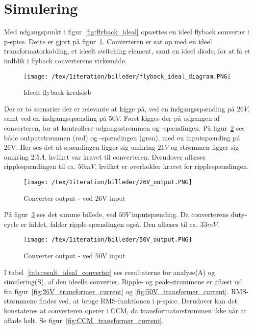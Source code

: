 \section{Simulering}
Med udgangspunkt i figur~\ref{fig:flyback_ideal} opsættes en ideel flyback converter i p-spice. Dette er gjort på figur~\ref{fig:ideal_flyback_diagram}. Converteren er sat op med en ideel transformatorkobling, et ideelt switching element, samt en ideel diode, for at få et indblik i flyback converterens virkemåde. 


\begin{figure}[H]
	\center
	\texttt{[image: /tex/1iteration/billeder/flyback\_ideal\_diagram.PNG]}
	\caption{Ideelt flyback kredsløb}
	\label{fig:ideal_flyback_diagram}
\end{figure}

Der er to scenarier der er relevante at kigge på, ved en indgangsspænding på $26V$, samt ved en indgangsspænding på $50V$. Først kigges der på udgangen af converteren, for at kontrollere udgangsstrømmen og -spændingen. På figur~\ref{fig:26V_ideal_output} ses både outputstrømmen (rød) og -spændingen (grøn), med en inputspænding på 26V. Her ses det at spændingen ligger sig omkring $21V$ og strømmen ligger sig omkring $2.5A$, hvilket var kravet til converteren. Derudover aflæses ripplespændingen til ca. $50mV$, hvilket er overholder kravet for ripplespændingen. 

\begin{figure}[H]
	\center
	\texttt{[image: /tex/1iteration/billeder/26V\_output.PNG]}
	\caption{Converter output - ved 26V input}
	\label{fig:26V_ideal_output}
\end{figure}

\noindent På figur~\ref{fig:50V_ideal_output} ses det samme billede, ved $50V$ inputspænding. Da converterens duty-cycle er faldet, falder ripple-spændingen også. Den aflæses til ca. $33mV$. 


\begin{figure}[H]
	\center
	\texttt{[image: /tex/1iteration/billeder/50V\_output.PNG]}
	\caption{Converter output - ved 50V input}
	\label{fig:50V_ideal_output}
\end{figure}

\noindent I tabel~\ref{tab:result_ideal_converter} ses resultaterne for analyse(A) og simulering(S), af den ideelle converter. Ripple- og peak-strømmene er aflæst ud fra figur~\ref{fig:26V_transformer_current} og \ref{fig:50V_transformer_current}. RMS-strømmene findes ved, at bruge RMS-funktionen i p-spice. Derudover kan det konstateres at converteren operer i CCM, da transformatorstrømmen ikke når at aflade helt. Se figur~\ref{fig:CCM_transformer_current}. 

